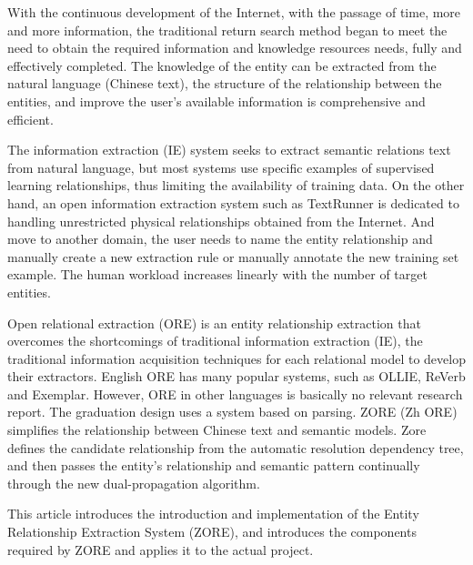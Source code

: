 \begin{enabstract}
With the continuous development of the Internet, with the passage of time, more and more information, the traditional return search method began to meet the need to obtain the required information and knowledge resources needs, fully and effectively completed. The knowledge of the entity can be extracted from the natural language (Chinese text), the structure of the relationship between the entities, and improve the user's available information is comprehensive and efficient.

The information extraction (IE) system seeks to extract semantic relations text from natural language, but most systems use specific examples of supervised learning relationships, thus limiting the availability of training data. On the other hand, an open information extraction system such as TextRunner is dedicated to handling unrestricted physical relationships obtained from the Internet. And move to another domain, the user needs to name the entity relationship and manually create a new extraction rule or manually annotate the new training set example. The human workload increases linearly with the number of target entities.

Open relational extraction (ORE) is an entity relationship extraction that overcomes the shortcomings of traditional information extraction (IE), the traditional information acquisition techniques for each relational model to develop their extractors. English ORE has many popular systems, such as OLLIE, ReVerb and Exemplar. However, ORE in other languages ​​is basically no relevant research report. The graduation design uses a system based on parsing. ZORE (Zh ORE) simplifies the relationship between Chinese text and semantic models. Zore defines the candidate relationship from the automatic resolution dependency tree, and then passes the entity's relationship and semantic pattern continually through the new dual-propagation algorithm.

This article introduces the introduction and implementation of the Entity Relationship Extraction System (ZORE), and introduces the components required by ZORE and applies it to the actual project.

\end{enabstract}

